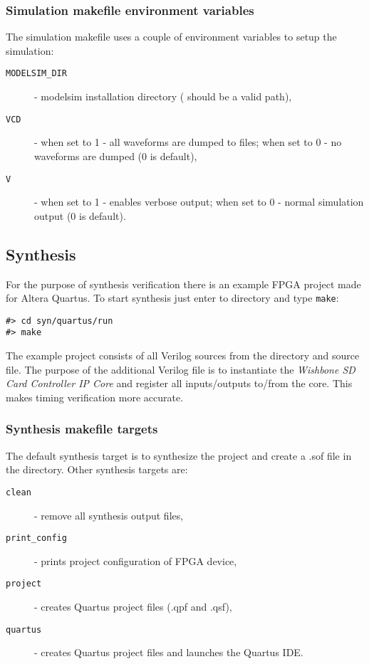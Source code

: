     \subsubsection{Simulation makefile environment variables}
    \label{sec:sim_make_var}
    
    The simulation makefile uses a couple of environment variables to setup the simulation:
    \begin{description}
    \item[\texttt{MODELSIM\_DIR}] - modelsim installation directory ( should be a valid path),
    \item[\texttt{VCD}] - when set to 1 - all waveforms are dumped to  files; when set to 0 - no waveforms are dumped (0 is default),
    \item[\texttt{V}] - when set to 1 - enables verbose output; when set to 0 - normal simulation output (0 is default).
    \end{description}

    
    \subsection{Synthesis}
    \label{sec:synthesis}
    
    For the purpose of synthesis verification there is an example FPGA project made for Altera Quartus.
    To start synthesis just enter to  directory and type \texttt{make}:
    \begin{verbatim}
#> cd syn/quartus/run
#> make
    \end{verbatim}
    The example project consists of all Verilog sources from the  directory and  source file. 
    The purpose of the additional Verilog file is to instantiate the \textit{Wishbone SD Card Controller IP Core} and register all inputs/outputs to/from the core.
    This makes timing verification more accurate.
    
    \subsubsection{Synthesis makefile targets}
    \label{sec:syn_make_targ}
    
    The default synthesis target is to synthesize the project and create a .sof file in the  directory. Other synthesis targets are:
    \begin{description}
    \item[\texttt{clean}] - remove all synthesis output files,
    \item[\texttt{print\_config}] - prints project configuration of FPGA device,
    \item[\texttt{project}] - creates Quartus project files (.qpf and .qsf),
    \item[\texttt{quartus}] - creates Quartus project files and launches the Quartus IDE.
    \end{description}
    
